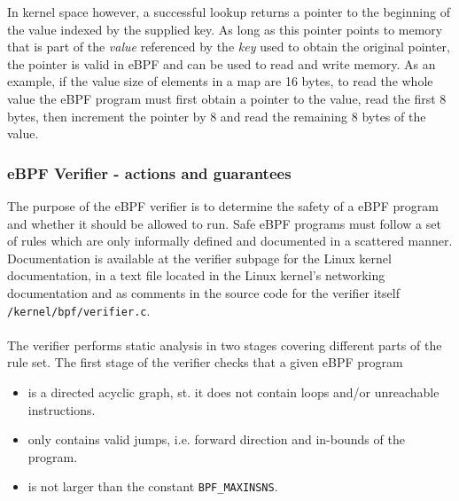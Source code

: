In kernel space however, a successful lookup returns a pointer to the beginning of the value indexed by the supplied key. As long as this pointer points to memory that is part of the \textit{value} referenced by the \textit{key} used to obtain the original pointer, the pointer is valid in eBPF and can be used to read and write memory. As an example, if the value size of elements in a map are 16 bytes, to read the whole value the eBPF program must first obtain a pointer to the value, read the first 8 bytes, then increment the pointer by 8 and read the remaining 8 bytes of the value.


\subsubsection{eBPF Verifier - actions and guarantees}


The purpose of the eBPF verifier is to determine the safety of a eBPF program and whether it should be allowed to run.
Safe eBPF programs must follow a set of rules which are only informally defined and documented in a scattered manner. Documentation is available at the verifier subpage for the Linux kernel documentation\cite{ebpf-verifier}, in a text file located in the Linux kernel's networking documentation\cite{ebpf-filter} and as comments in the source code for the verifier itself
\texttt{/kernel/bpf/verifier.c}\cite{ebpf-verifier-source}. 

\paragraph{}
The verifier performs static analysis in two stages covering different parts of the rule set.
The first stage of the verifier checks that a given eBPF program
\begin{itemize}
\item is a directed acyclic graph, st. it does not contain loops and/or unreachable instructions.
\item only contains valid jumps, i.e. forward direction and in-bounds of the program.
\item is not larger than the constant \texttt{BPF\_MAXINSNS}.
\end{itemize}

